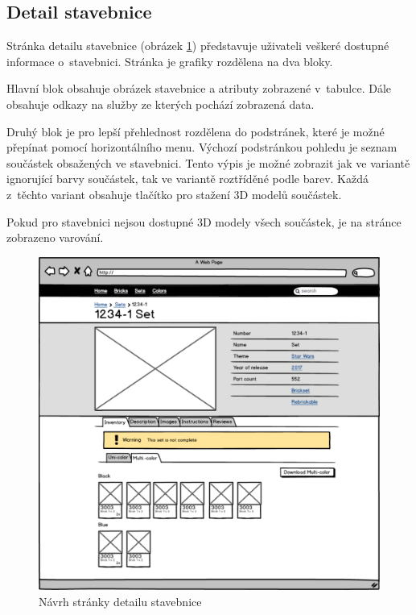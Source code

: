 \subsection{Detail stavebnice}
Stránka detailu stavebnice (obrázek \ref{wireframe-stavebnice-detail}) představuje uživateli veškeré dostupné informace o~stavebnici. Stránka je grafiky rozdělena na dva bloky. 

Hlavní blok obsahuje obrázek stavebnice a atributy zobrazené v~tabulce. Dále obsahuje odkazy na služby ze kterých pochází zobrazená data.

Druhý blok je pro lepší přehlednost rozdělena do podstránek, které je možné přepínat pomocí horizontálního menu. Výchozí podstránkou pohledu je seznam součástek obsažených ve stavebnici. Tento výpis je možné zobrazit jak ve variantě ignorující barvy součástek, tak ve variantě roztříděné podle barev. Každá z~těchto variant obsahuje tlačítko pro stažení 3D modelů součástek.

Pokud pro stavebnici nejsou dostupné 3D modely všech součástek, je na stránce zobrazeno varování. 

\begin{figure}[htbp]
    \centering
    \includegraphics[width=\textwidth,height=\textheight,keepaspectratio]{pdfs/wireframe_set.pdf}
    \caption{Návrh stránky detailu stavebnice}\label{wireframe-stavebnice-detail}
\end{figure}

